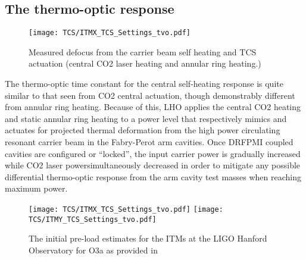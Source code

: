 \subsection{The thermo-optic response}
\begin{figure}[!ht]
  \centering
  \begin{subcaptiongroup}
	  \texttt{[image: TCS/ITMX\_TCS\_Settings\_tvo.pdf]}
	  \label{TO_response}
  \end{subcaptiongroup}
  \captionsetup{subrefformat=parens}
  \hfill
  \caption{Measured defocus from the carrier beam self heating and TCS actuation (central CO2 laser heating and annular ring heating.)} 
\label{fig:thermooptic_response}
\end{figure}
The thermo-optic time constant for the central self-heating response is quite similar to that seen from CO2 central actuation, though demonstrably different from annular ring heating. Because of this, LHO applies the central CO2 heating and static annular ring heating to a power level that respectively mimics and actuates for projected thermal deformation from the high power circulating resonant carrier beam in the Fabry-Perot arm cavities. Once DRFPMI coupled cavities are configured or ``locked'', the input carrier power is gradually increased while CO2 laser powersimultaneously decreased in order to mitigate any possible differential thermo-optic response from the arm cavity test masses when reaching maximum power.
\begin{figure}[!ht]
  \centering
  \begin{subcaptiongroup}
	  \texttt{[image: TCS/ITMX\_TCS\_Settings\_tvo.pdf]}
	  \label{ITMX_TCS}
	  \texttt{[image: TCS/ITMY\_TCS\_Settings\_tvo.pdf]}
	  \label{ITMY_TCS}
  \end{subcaptiongroup}
  \captionsetup{subrefformat=parens}
  \hfill
  \caption{The initial pre-load estimates for the ITMs at the LIGO Hanford Observatory for O3a as provided in \cite{tvo}} 
  \label{fig:O3_preload_tvo}
\end{figure}


